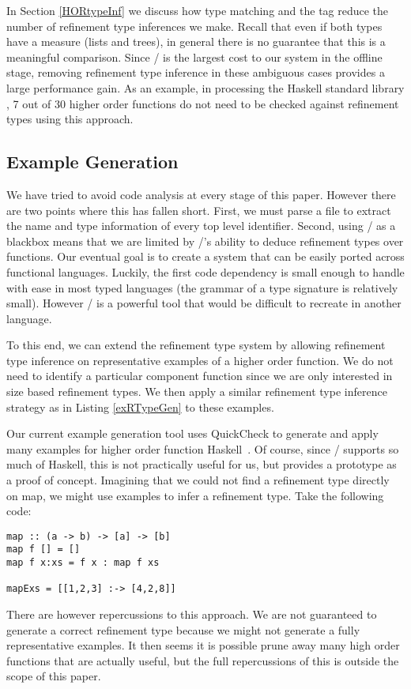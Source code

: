 In Section \ref{HORtypeInf} we discuss how type matching and the  tag reduce the number of refinement type inferences we make. Recall that even if both types have a measure (lists and trees), in general there is no guarantee that this is a meaningful comparison. Since \lhask/ is the largest cost to our system in the offline stage, removing refinement type inference in these ambiguous cases provides a large performance gain. As an example, in processing the Haskell standard library , 7 out of 30 higher order functions do not need to be checked against refinement types using this approach.


\subsection{Example Generation}\label{languageSupport}

We have tried to avoid code analysis at every stage of this paper.
However there are two points where this has fallen short.
First, we must parse a file to extract the name and type information of every top level identifier.
Second, using \lhask/ as a blackbox means that we are limited by \lhask/'s ability to deduce refinement types over functions.
Our eventual goal is to create a system that can be easily ported across functional languages.
Luckily, the first code dependency is small enough to handle with ease in most typed languages (the grammar of a type signature is relatively small). However \lhask/ is a powerful tool that would be difficult to recreate in another language.

To this end, we can extend the refinement type system by allowing refinement type inference on representative examples of a higher order function.
We do not need to identify a particular component function since we are only interested in size based refinement types.
We then apply a similar refinement type inference strategy as in Listing \ref{exRTypeGen} to these examples.

Our current example generation tool uses QuickCheck to generate and apply many examples for higher order function Haskell~\cite{quickcheck}.
Of course, since \lhask/ supports so much of Haskell, this is not practically useful for us, but provides a prototype as a proof of concept.
Imagining that we could not find a refinement type directly on map, we might use examples to infer a refinement type. Take the following code:

\begin{lstlisting}[numbers=none]
map :: (a -> b) -> [a] -> [b]
map f [] = []
map f x:xs = f x : map f xs

mapExs = [[1,2,3] :-> [4,2,8]]
\end{lstlisting}

There are however repercussions to this approach. We are not guaranteed to generate a correct refinement type because we might not generate a fully representative examples. It then seems it is possible prune away many high order functions that are actually useful, but the full repercussions of this is outside the scope of this paper.
